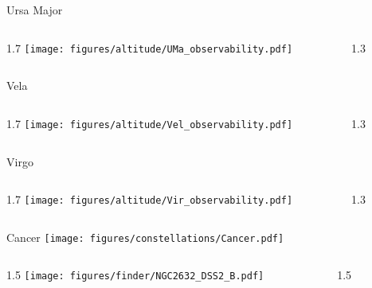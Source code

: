 \documentclass[final]{beamer}
\newlength{\colwidth}
\begin{document}
\begin{frame}[t]{}

  \Large{Ursa Major}
  \begin{columns}[T]
    \begin{column}{1.7\colwidth}
      \centering
      \texttt{[image: figures/altitude/UMa\_observability.pdf]}
    \end{column}
    \begin{column}{1.3\colwidth}
      \Large
      
    \end{column}
  \end{columns}

  \Large{Vela}
  \begin{columns}[T]
    \begin{column}{1.7\colwidth}
      \centering
      \texttt{[image: figures/altitude/Vel\_observability.pdf]}
    \end{column}
    \begin{column}{1.3\colwidth}
      \Large
      
    \end{column}
  \end{columns}

  \Large{Virgo}
  \begin{columns}[T]
    \begin{column}{1.7\colwidth}
      \centering
      \texttt{[image: figures/altitude/Vir\_observability.pdf]}
    \end{column}
    \begin{column}{1.3\colwidth}
      \Large
      
    \end{column}
  \end{columns}
\end{frame}

\begin{frame}[t]{\LARGE Cancer}
  \centering
  \texttt{[image: figures/constellations/Cancer.pdf]}
\end{frame}


\begin{frame}[t]{}
  \begin{columns}[T]
    \begin{column}{1.5\colwidth}
      \centering
      \texttt{[image: figures/finder/NGC2632\_DSS2\_B.pdf]}
    \end{column}
    \begin{column}{1.5\colwidth}
      \Large
      
    \end{column}
  \end{columns}
  \vspace{\fill}
\end{frame}
\end{document}
